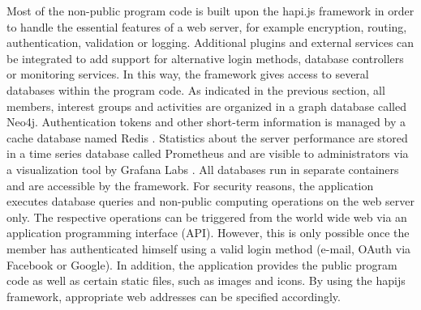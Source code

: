 \documentclass[12pt,numbers=noenddot,parskip,bibliography=totocnumbered,listof=totocnumbered,draft]{scrreprt}
\begin{document}
Most of the non-public program code is built upon the hapi.js \citep{hapijs} framework in order to handle the essential features of a web server, for example encryption, routing, authentication, validation or logging. Additional plugins and external services can be integrated to add support for alternative login methods, database controllers or monitoring services. In this way, the framework gives access to several databases within the program code. As indicated in the previous section, all members, interest groups and activities are organized in a graph database called Neo4j. Authentication tokens and other short-term information is managed by a cache database named Redis \citep{redis}. Statistics about the server performance are stored in a time series database called Prometheus\citep{prometheus} and are visible to administrators via a visualization tool by Grafana Labs \citep{grafana}. All databases run in separate containers and are accessible by the framework. For security reasons, the application executes database queries and non-public computing operations on the web server only. The respective operations can be triggered from the world wide web via an application programming interface (API). However, this is only possible once the member has authenticated himself using a valid login method (e-mail, OAuth via Facebook or Google). In addition, the application provides the public program code as well as certain static files, such as images and icons. By using the hapijs framework, appropriate web addresses can be specified accordingly.
\end{document}
